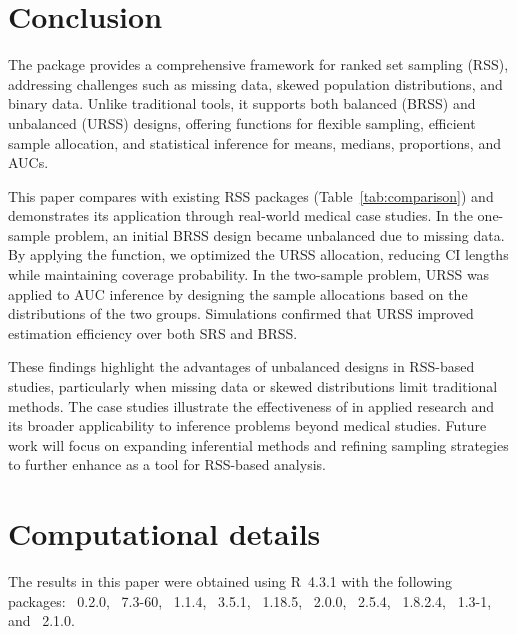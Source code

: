 
\section{Conclusion} \label{sec:con}
The  package provides a comprehensive framework for ranked set sampling (RSS), addressing challenges such as missing data, skewed population distributions, and binary data. Unlike traditional tools, it supports both balanced (BRSS) and unbalanced (URSS) designs, offering functions for flexible sampling, efficient sample allocation, and statistical inference for means, medians, proportions, and AUCs.

This paper compares  with existing RSS packages (Table~\ref{tab:comparison}) and demonstrates its application through real-world medical case studies. In the one-sample problem, an initial BRSS design became unbalanced due to missing data. By applying the  function, we optimized the URSS allocation, reducing CI lengths while maintaining coverage probability. In the two-sample problem, URSS was applied to AUC inference by designing the sample allocations based on the distributions of the two groups. Simulations confirmed that URSS improved estimation efficiency over both SRS and BRSS.

These findings highlight the advantages of unbalanced designs in RSS-based studies, particularly when missing data or skewed distributions limit traditional methods. The case studies illustrate the effectiveness of  in applied research and its broader applicability to inference problems beyond medical studies. Future work will focus on expanding inferential methods and refining sampling strategies to further enhance  as a tool for RSS-based analysis.


\section*{Computational details}

The results in this paper were obtained using R~4.3.1 with the following packages: ~0.2.0, ~7.3-60, ~1.1.4, ~3.5.1, ~1.18.5, ~2.0.0, ~2.5.4, ~1.8.2.4, ~1.3-1, and ~2.1.0. %


